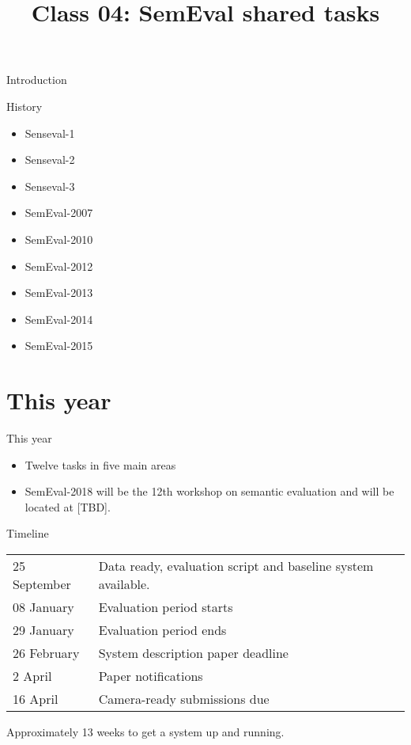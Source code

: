 \documentclass[10pt, compress]{beamer}
\title{Class 04: SemEval shared tasks}
\begin{document}
\maketitle


\begin{frame}{Introduction}


\end{frame}


\begin{frame}{History}

\begin{itemize}
  \item Senseval-1
  \item Senseval-2
  \item Senseval-3
  \item SemEval-2007
  \item SemEval-2010
  \item SemEval-2012
  \item SemEval-2013
  \item SemEval-2014
  \item SemEval-2015
\end{itemize}

\end{frame}



\section{This year}

\begin{frame}{This year}

\begin{itemize}
  \item Twelve tasks in five main areas
  \item SemEval-2018 will be the 12th workshop on semantic evaluation and will be located at [TBD]. 
\end{itemize}

\end{frame}

\begin{frame}{Timeline}

\begin{tabular}{ll}

25 September & Data ready, evaluation script and baseline system available. \\
08 January   & Evaluation period starts \\
29 January   & Evaluation period ends \\
26 February  & System description paper deadline \\
2  April     & Paper notifications \\
16 April     & Camera-ready submissions due \\
\end{tabular}

Approximately 13 weeks to get a system up and running.

\end{frame}
\end{document}
